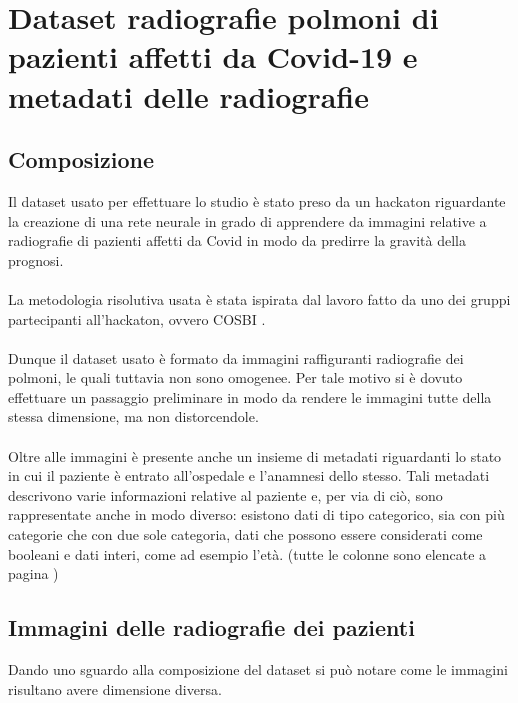 \chapter{Dataset radiografie polmoni di pazienti affetti da Covid-19 e metadati delle radiografie}
\label{ch:Dataset}
\section{Composizione}
Il dataset usato per effettuare lo studio è stato preso da un hackaton \cite{ai} riguardante la creazione di una rete neurale in grado di apprendere 
da immagini relative a radiografie di pazienti affetti da Covid in modo da predirre la gravità della prognosi.
\\\\
La metodologia risolutiva usata è stata ispirata dal lavoro fatto da uno dei gruppi partecipanti all'hackaton, ovvero COSBI \cite{cch}.
\\\\
Dunque il dataset usato è formato da immagini raffiguranti radiografie dei polmoni, le quali tuttavia non sono omogenee. Per tale motivo 
si è dovuto effettuare un passaggio preliminare in modo da rendere le immagini tutte della stessa dimensione, ma non distorcendole.
\\\\
Oltre alle immagini è presente anche un insieme di metadati riguardanti lo stato in cui il paziente è entrato all'ospedale e l'anamnesi dello stesso.
Tali metadati descrivono varie informazioni relative al paziente e, per via di ciò, sono rappresentate anche in modo diverso: esistono dati di tipo categorico, sia con più categorie che con
due sole categoria, dati che possono essere considerati come booleani e dati interi, come ad esempio l'età.
(tutte le colonne sono elencate a pagina \pageref{eterogeneo})
\clearpage
\section{Immagini delle radiografie dei pazienti}
Dando uno sguardo alla composizione del dataset si può notare come le immagini risultano avere dimensione diversa.


